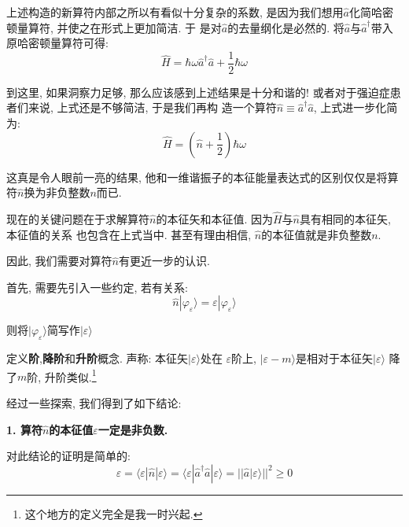 \documentclass[a4paper, 11pt]{article}
\begin{document}
\begin{spacing}{1.2}
        上述构造的新算符内部之所以有看似十分复杂的系数, 是因为我们想用$\hat{a}$化简哈密顿量算符, 并使之在形式上更加简洁. 于
        是对$\hat{a}$的去量纲化是必然的. 将$\hat{a}$与$\hat{a}^{\dagger}$带入原哈密顿量算符可得:
        \begin{equation}
          \hat{H} = \hbar\omega\hat{a}^{\dagger}\hat{a}+\dfrac{1}{2}\hbar\omega
        \end{equation}

        到这里, 如果洞察力足够, 那么应该感到上述结果是十分和谐的! 或者对于强迫症患者们来说, 上式还是不够简洁, 于是我们再构
        造一个算符$\hat{n}\equiv\hat{a}^{\dagger}\hat{a}$, 上式进一步化简为:
        \begin{equation}
          \hat{H} = \left(\hat{n}+\dfrac{1}{2}\right)\hbar\omega
        \end{equation}

        这真是令人眼前一亮的结果, 他和一维谐振子的本征能量表达式的区别仅仅是将算符$\hat{n}$换为非负整数$n$而已. 

        现在的关键问题在于求解算符$\hat{n}$的本征矢和本征值. 因为$\hat{H}$与$\hat{n}$具有相同的本征矢, 本征值的关系
        也包含在上式当中. 甚至有理由相信, $\hat{n}$的本征值就是非负整数$n$.
        
        因此, 我们需要对算符$\hat{n}$有更近一步的认识.  

        首先, 需要先引入一些约定, 若有关系:
        \begin{equation}
          \hat{n}|\varphi_{\varepsilon}\rangle = \varepsilon|\varphi_{\varepsilon}\rangle
        \end{equation}
      
        则将$|\varphi_{\varepsilon}\rangle$简写作$|\varepsilon\rangle$

        定义\textbf{阶},\textbf{降阶}和\textbf{升阶}概念. 声称: 本征矢$|\varepsilon\rangle$处在
        $\varepsilon$阶上, $|\varepsilon-m\rangle$是相对于本征矢$|\varepsilon\rangle$
        降了$m$阶, 升阶类似.\footnote{这个地方的定义完全是我一时兴起.}

        经过一些探索, 我们得到了如下结论:

        \textbf{1. 算符$\hat{n}$的本征值$\varepsilon$一定是非负数.}

        对此结论的证明是简单的: 
        \begin{equation}
          \varepsilon = \langle\varepsilon|\hat{n}|\varepsilon\rangle %
                      = \langle\varepsilon|\hat{a}^{\dagger}\hat{a}|\varepsilon\rangle%
                      = \big|\big|\hat{a}|\varepsilon\rangle\big|\big|^2 \geq 0
        \end{equation}


\end{spacing}
\end{document}
